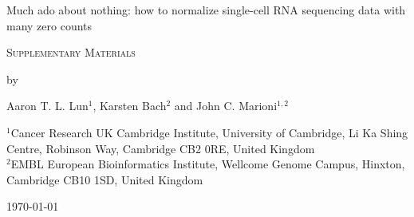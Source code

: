 \documentclass{article}
\begin{document}
\begin{titlepage}
\vspace*{3cm}
\begin{center}

{\LARGE
Much ado about nothing: how to normalize single-cell RNA sequencing data with many zero counts
\par}

\vspace{0.75cm}

{\Large 
    \textsc{Supplementary Materials}
\par
}
\vspace{0.75cm}

\large
by

\vspace{0.75cm}
Aaron T. L. Lun$^{1}$, Karsten Bach$^{2}$ and John C. Marioni$^{1,2}$

\vspace{1cm}
\begin{minipage}{0.9\textwidth}
\begin{flushleft} 
$^1$Cancer Research UK Cambridge Institute, University of Cambridge, Li Ka Shing Centre, Robinson Way, Cambridge CB2 0RE, United Kingdom \\[6pt]
$^2$EMBL European Bioinformatics Institute, Wellcome Genome Campus, Hinxton, Cambridge CB10 1SD, United Kingdom \\[6pt]
\end{flushleft}
\end{minipage}

\vspace{1.5cm}
{\large \today{}}

\vspace*{\fill}
\end{center}
\end{titlepage}
\end{document}
